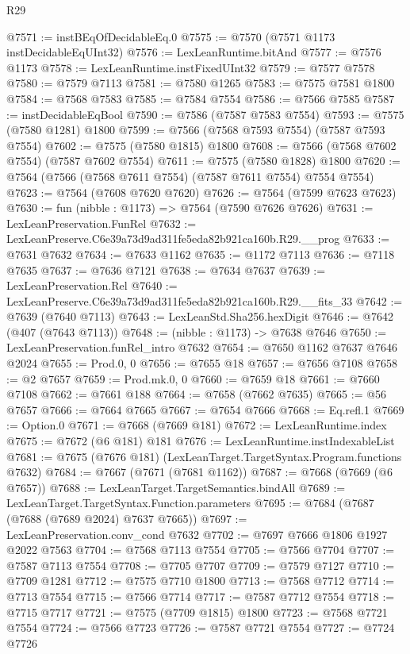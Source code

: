 \begin{lexlean}{R29}
\begin{coremodule}
@7571 := instBEqOfDecidableEq.{0}
@7575 := @7570 (@7571 @1173 instDecidableEqUInt32)
@7576 := LexLeanRuntime.bitAnd
@7577 := @7576 @1173
@7578 := LexLeanRuntime.instFixedUInt32
@7579 := @7577 @7578
@7580 := @7579 @7113
@7581 := @7580 @1265
@7583 := @7575 @7581 @1800
@7584 := @7568 @7583
@7585 := @7584 @7554
@7586 := @7566 @7585
@7587 := instDecidableEqBool
@7590 := @7586 (@7587 @7583 @7554)
@7593 := @7575 (@7580 @1281) @1800
@7599 := @7566 (@7568 @7593 @7554) (@7587 @7593 @7554)
@7602 := @7575 (@7580 @1815) @1800
@7608 := @7566 (@7568 @7602 @7554) (@7587 @7602 @7554)
@7611 := @7575 (@7580 @1828) @1800
@7620 := @7564 (@7566 (@7568 @7611 @7554) (@7587 @7611 @7554) @7554 @7554)
@7623 := @7564 (@7608 @7620 @7620)
@7626 := @7564 (@7599 @7623 @7623)
@7630 := fun (nibble : @1173) => @7564 (@7590 @7626 @7626)
@7631 := LexLeanPreservation.FunRel
@7632 := LexLeanPreserve.C6e39a73d9ad311fe5eda82b921ca160b.R29.__prog
@7633 := @7631 @7632
@7634 := @7633 @1162
@7635 := @1172 @7113
@7636 := @7118 @7635
@7637 := @7636 @7121
@7638 := @7634 @7637
@7639 := LexLeanPreservation.Rel
@7640 := LexLeanPreserve.C6e39a73d9ad311fe5eda82b921ca160b.R29.__fits_33
@7642 := @7639 (@7640 @7113)
@7643 := LexLeanStd.Sha256.hexDigit
@7646 := @7642 (@407 (@7643 @7113))
@7648 := (nibble : @1173) -> @7638 @7646
@7650 := LexLeanPreservation.funRel_intro @7632
@7654 := @7650 @1162 @7637 @7646 @2024
@7655 := Prod.{0, 0}
@7656 := @7655 @18
@7657 := @7656 @7108
@7658 := @2 @7657
@7659 := Prod.mk.{0, 0}
@7660 := @7659 @18
@7661 := @7660 @7108
@7662 := @7661 @188
@7664 := @7658 (@7662 @7635)
@7665 := @56 @7657
@7666 := @7664 @7665
@7667 := @7654 @7666
@7668 := Eq.refl.{1}
@7669 := Option.{0}
@7671 := @7668 (@7669 @181)
@7672 := LexLeanRuntime.index
@7675 := @7672 (@6 @181) @181
@7676 := LexLeanRuntime.instIndexableList
@7681 := @7675 (@7676 @181) (LexLeanTarget.TargetSyntax.Program.functions @7632)
@7684 := @7667 (@7671 (@7681 @1162))
@7687 := @7668 (@7669 (@6 @7657))
@7688 := LexLeanTarget.TargetSemantics.bindAll
@7689 := LexLeanTarget.TargetSyntax.Function.parameters
@7695 := @7684 (@7687 (@7688 (@7689 @2024) @7637 @7665))
@7697 := LexLeanPreservation.conv_cond @7632
@7702 := @7697 @7666 @1806 @1927 @2022 @7563
@7704 := @7568 @7113 @7554
@7705 := @7566 @7704
@7707 := @7587 @7113 @7554
@7708 := @7705 @7707
@7709 := @7579 @7127
@7710 := @7709 @1281
@7712 := @7575 @7710 @1800
@7713 := @7568 @7712
@7714 := @7713 @7554
@7715 := @7566 @7714
@7717 := @7587 @7712 @7554
@7718 := @7715 @7717
@7721 := @7575 (@7709 @1815) @1800
@7723 := @7568 @7721 @7554
@7724 := @7566 @7723
@7726 := @7587 @7721 @7554
@7727 := @7724 @7726

\end{coremodule}
\end{lexlean}
